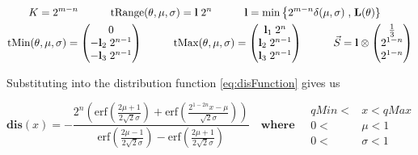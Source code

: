   \begin{gather*}
  \begin{aligned}
  K & =  2^{m-n}  \quad & \quad  
  \tRange(\theta,\mu,\sigma)   & =  \mathbf{l} \; 2^n \quad & \quad
  \mathbf{l}  & = \min\left\{ 2^{m-n}\delta(\mu,\sigma) \right. ,  \left. \mathbf{L}(\theta) \right\} 
   \end{aligned} \\
   \begin{aligned}
    \tMin(\theta,\mu,\sigma)   & =
   \begin{pmatrix}
      0 \\
    -\mathbf{l}_2 \; 2^{n-1}  \\  
    -\mathbf{l}_3 \; 2^{n-1} \\  
   \end{pmatrix} \quad & \quad
    \tMax(\theta,\mu,\sigma)   & =
   \begin{pmatrix}
    \mathbf{l}_1 \; 2^n  \\
    \mathbf{l}_2 \; 2^{n-1}  \\  
    \mathbf{l}_3 \; 2^{n-1} \\  
   \end{pmatrix} \quad & \quad
     \Scale &=
      \mathbf{l} \otimes
     \begin{pmatrix}
       \frac{1}{3} \\
      2^{1-n } \\
      2^{1-n }  \\
     \end{pmatrix}    \\
   \end{aligned}
  \end{gather*}
  
  Substituting into the distribution function \ref{eq:disFunction} gives us
  
  \begin{equation}
\textbf{dis}(x) =  -\frac{2^n \left(\text{erf}\left(\frac{2 \mu +1}{2 \sqrt{2} \sigma }\right)+\text{erf}\left(\frac{2^{1-2 n} x-\mu }{\sqrt{2} \sigma }\right)\right)}{\text{erf}\left(\frac{2 \mu -1}{2 \sqrt{2} \sigma }\right)-\text{erf}\left(\frac{2 \mu +1}{2 \sqrt{2} \sigma }\right)} \quad \textbf{where} \quad
\begin{array}{rl}
qMin < & x  < qMax \\
0 < &\mu <1\\
0 < &\sigma <1
\end{array}
  \end{equation}
  
